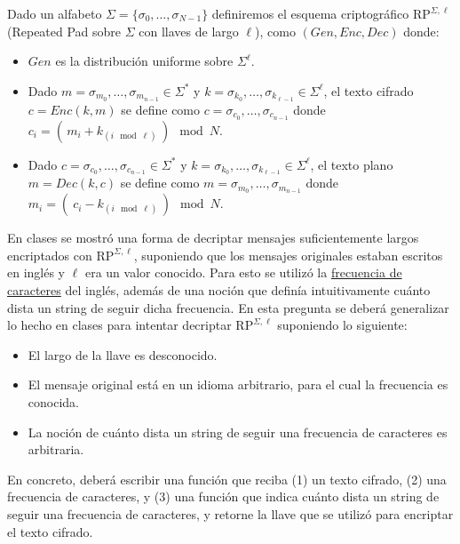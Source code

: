
Dado un alfabeto $\Sigma=\{\sigma_0,\ldots,\sigma_{N-1}\}$ definiremos el esquema criptográfico $\text{RP}^{\Sigma, \ell}$ (Repeated Pad sobre $\Sigma$ con llaves de largo $\ell$), como $(Gen, Enc, Dec)$ donde:
\begin{itemize}
  \item $Gen$ es la distribución uniforme sobre $\Sigma^\ell$.
  \item Dado $m=\sigma_{m_0},\ldots,\sigma_{m_{n-1}}\in\Sigma^*$ y $k=\sigma_{k_0},\ldots,\sigma_{k_{\ell-1}}\in\Sigma^\ell$, el texto cifrado $c=Enc(k, m)$ se define como $c=\sigma_{c_0},\ldots,\sigma_{c_{n-1}}$ donde $c_i=(\,m_i + k_{(i \!\mod \ell)}\,)\mod N$.
  \item Dado $c=\sigma_{c_0},\ldots,\sigma_{c_{n-1}}\in\Sigma^*$ y $k=\sigma_{k_0},\ldots,\sigma_{k_{\ell-1}}\in\Sigma^\ell$, el texto plano $m=Dec(k, c)$ se define como $m=\sigma_{m_0},\ldots,\sigma_{m_{n-1}}$ donde $m_i=(\ c_i - k_{(i\!\mod \ell)}\,)\mod N$.
  
\end{itemize}

En clases se mostró una forma de decriptar mensajes suficientemente largos encriptados con $\text{RP}^{\Sigma,\ell}$, suponiendo que los mensajes originales estaban escritos en inglés y $\ell$ era un valor conocido. Para esto se utilizó la \href{https://en.wikipedia.org/wiki/Letter_frequency}{frecuencia de caracteres} del inglés, además de una noción que definía intuitivamente cuánto dista un string de seguir dicha frecuencia. En esta pregunta se deberá generalizar lo hecho en clases para intentar decriptar $\text{RP}^{\Sigma, \ell}$ suponiendo lo siguiente:

\begin{itemize}
  \item El largo de la llave es desconocido.
  \item El mensaje original está en un idioma arbitrario, para el cual la frecuencia es conocida.
  \item La noción de cuánto dista un string de seguir una frecuencia de caracteres es arbitraria.
\end{itemize}

En concreto, deberá escribir una función que reciba (1) un texto cifrado, (2) una frecuencia de caracteres, y (3) una función que indica cuánto dista un string de seguir una frecuencia de caracteres, y retorne la llave que se utilizó para encriptar el texto cifrado.

